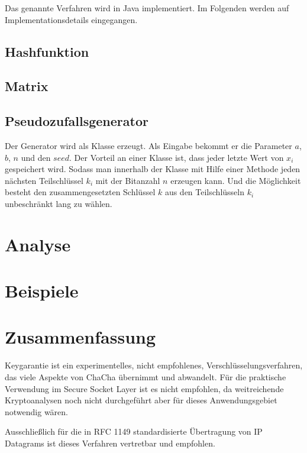 \documentclass[10pt,a4paper]{article}
\begin{document}
Das genannte Verfahren wird in Java implementiert.
Im Folgenden werden auf Implementationsdetails eingegangen.

\subsection{Hashfunktion}

\subsection{Matrix}

\subsection{Pseudozufallsgenerator}

Der Generator wird als Klasse erzeugt.
Als Eingabe bekommt er die Parameter $a$, $b$, $n$ und
den $seed$.
Der Vorteil an einer Klasse ist, dass jeder letzte Wert von $x_i$ gespeichert wird.
Sodass
man innerhalb der Klasse mit Hilfe einer Methode jeden nächsten Teilschlüssel $k_i$ mit der
Bitanzahl $n$ erzeugen kann.
Und die Möglichkeit besteht den zusammengesetzten Schlüssel $k$
aus den Teilschlüsseln $k_i$ unbeschränkt lang zu wählen.

\section{Analyse}

\section{Beispiele}

\section{Zusammenfassung}

Keygarantie ist ein experimentelles, nicht empfohlenes, Verschlüsselungsverfahren, das viele Aspekte von ChaCha übernimmt und abwandelt.
Für die praktische Verwendung im Secure Socket Layer ist es nicht empfohlen, da weitreichende Kryptoanalysen noch nicht durchgeführt aber für dieses Anwendungsgebiet notwendig wären.

Ausschließlich für die in RFC 1149 standardisierte Übertragung von IP Datagrams\cite{Waitzman1990} ist dieses Verfahren vertretbar und empfohlen.

{}

\end{document}
